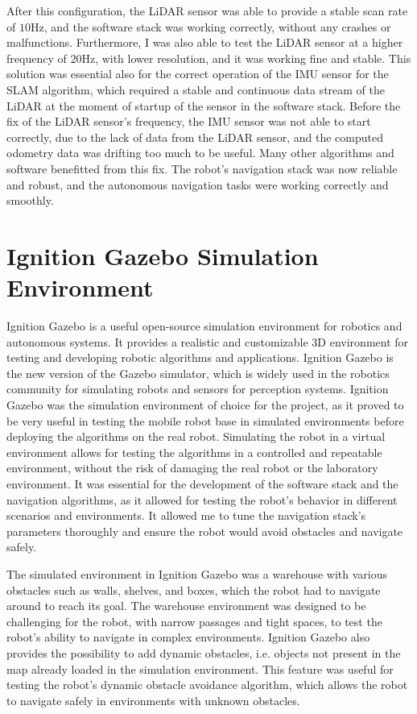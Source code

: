 After this configuration, the LiDAR sensor was able to provide a stable scan rate of $10$Hz,
and the software stack was working correctly, without any crashes or malfunctions.
Furthermore, I was also able to test the LiDAR sensor at a higher frequency of $20$Hz, 
with lower resolution, and it was working fine and stable.
This solution was essential also for the correct operation of the IMU sensor for the SLAM algorithm, which required
a stable and continuous data stream of the LiDAR at the moment of startup of the sensor in the software stack. Before the 
fix of the LiDAR sensor's frequency, the IMU sensor was not able to start correctly, due to the lack of data
from the LiDAR sensor, and the computed odometry data was drifting too much to be useful.
Many other algorithms and software benefitted from this fix. The robot's navigation stack was now reliable and robust,
and the autonomous navigation tasks were working correctly and smoothly.


\section{Ignition Gazebo Simulation Environment}

Ignition Gazebo is a useful open-source simulation environment for robotics and autonomous systems.
It provides a realistic and customizable 3D environment for testing and developing robotic algorithms and applications.
Ignition Gazebo is the new version of the Gazebo simulator, which is widely used in the robotics community for simulating
robots and sensors for perception systems. Ignition Gazebo was the simulation environment of choice for the project,
as it proved to be very useful in testing the mobile robot base in simulated environments before deploying the algorithms
on the real robot. Simulating the robot in a virtual environment allows for testing the algorithms in 
a controlled and repeatable environment, without the risk of damaging the real robot or the laboratory environment.
It was essential for the development of the software stack and the navigation algorithms, as it allowed for testing
the robot's behavior in different scenarios and environments. It allowed me to tune the navigation stack's parameters
thoroughly and ensure the robot would avoid obstacles and navigate safely.

The simulated environment in Ignition Gazebo was a warehouse with various obstacles such as walls, shelves, and boxes,
which the robot had to navigate around to reach its goal. The warehouse environment was designed to be challenging
for the robot, with narrow passages and tight spaces, to test the robot's ability to navigate in complex environments.
Ignition Gazebo also provides the possibility to add dynamic obstacles, i.e. objects not present in the map
already loaded in the simulation environment. This feature was useful for testing the robot's dynamic obstacle avoidance
algorithm, which allows the robot to navigate safely in environments with unknown obstacles.

